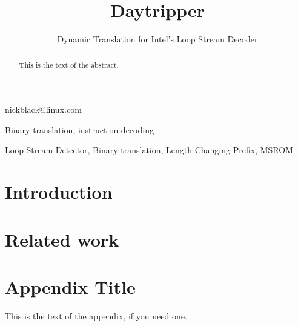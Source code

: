 \documentclass[]{sigplanconf}
\begin{document}

\title{Daytripper}
\subtitle{Dynamic Translation for Intel's Loop Stream Decoder}

           {nickblack@linux.com}

\maketitle

\begin{abstract}
This is the text of the abstract.
\end{abstract}


\terms
Binary translation, instruction decoding

\keywords
Loop Stream Detector, Binary translation, Length-Changing Prefix, MSROM

\section{Introduction}
\cite{inteloptimize}

\section{Related work}

\appendix
\section{Appendix Title}

This is the text of the appendix, if you need one.
\end{document}
